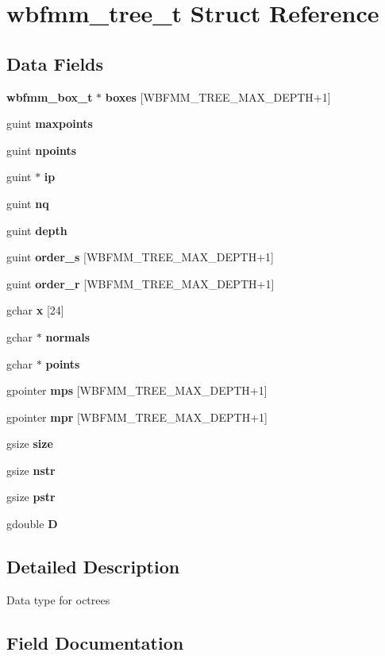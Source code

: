 \section{wbfmm\+\_\+tree\+\_\+t Struct Reference}
\label{structwbfmm__tree__t}
\subsection*{Data Fields}
\begin{DoxyCompactItemize}
\item 
{\bf wbfmm\+\_\+box\+\_\+t} $\ast$ {\bf boxes} [W\+B\+F\+M\+M\+\_\+\+T\+R\+E\+E\+\_\+\+M\+A\+X\+\_\+\+D\+E\+P\+T\+H+1]
\item 
guint {\bf maxpoints}
\item 
guint {\bf npoints}
\item 
guint $\ast$ {\bf ip}
\item 
guint {\bf nq}
\item 
guint {\bf depth}
\item 
guint {\bf order\+\_\+s} [W\+B\+F\+M\+M\+\_\+\+T\+R\+E\+E\+\_\+\+M\+A\+X\+\_\+\+D\+E\+P\+T\+H+1]
\item 
guint {\bf order\+\_\+r} [W\+B\+F\+M\+M\+\_\+\+T\+R\+E\+E\+\_\+\+M\+A\+X\+\_\+\+D\+E\+P\+T\+H+1]
\item 
gchar {\bf x} [24]
\item 
gchar $\ast$ {\bf normals}
\item 
gchar $\ast$ {\bf points}
\item 
gpointer {\bf mps} [W\+B\+F\+M\+M\+\_\+\+T\+R\+E\+E\+\_\+\+M\+A\+X\+\_\+\+D\+E\+P\+T\+H+1]
\item 
gpointer {\bf mpr} [W\+B\+F\+M\+M\+\_\+\+T\+R\+E\+E\+\_\+\+M\+A\+X\+\_\+\+D\+E\+P\+T\+H+1]
\item 
gsize {\bf size}
\item 
gsize {\bf nstr}
\item 
gsize {\bf pstr}
\item 
gdouble {\bf D}
\end{DoxyCompactItemize}


\subsection{Detailed Description}
Data type for octrees 

\subsection{Field Documentation}
